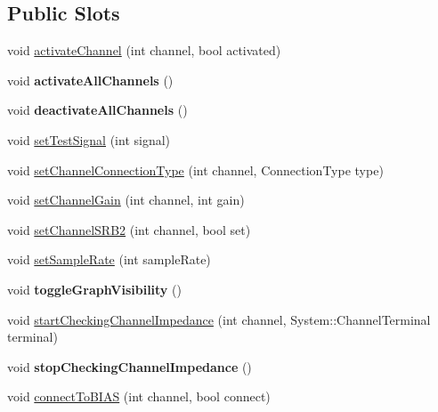 \subsection*{Public Slots}
\begin{DoxyCompactItemize}
\item 
void \hyperlink{classSystem_a2b4ee1465036831f1025add301e6809d}{activate\+Channel} (int channel, bool activated)
\item 
\hypertarget{classSystem_a1fed588e1273e8ea44394c91732a895b}{void {\bfseries activate\+All\+Channels} ()}\label{classSystem_a1fed588e1273e8ea44394c91732a895b}

\item 
\hypertarget{classSystem_ad2364ef8bc782840a0962ad00bcc1e0f}{void {\bfseries deactivate\+All\+Channels} ()}\label{classSystem_ad2364ef8bc782840a0962ad00bcc1e0f}

\item 
void \hyperlink{classSystem_ad6c8a797a836088d9d1706ece4b5480e}{set\+Test\+Signal} (int signal)
\item 
void \hyperlink{classSystem_ab3600fd2a9b8263f832cbe150a65be44}{set\+Channel\+Connection\+Type} (int channel, Connection\+Type type)
\item 
void \hyperlink{classSystem_a843b4c13738156abc2e7ccac51ad46e6}{set\+Channel\+Gain} (int channel, int gain)
\item 
void \hyperlink{classSystem_a40fd7729f43e5ac269a07723ed583ad1}{set\+Channel\+S\+R\+B2} (int channel, bool set)
\item 
void \hyperlink{classSystem_a49b471ea98c2431ad472d3701fca6db6}{set\+Sample\+Rate} (int sample\+Rate)
\item 
\hypertarget{classSystem_a147f252c0eacc362e062b9413441abf8}{void {\bfseries toggle\+Graph\+Visibility} ()}\label{classSystem_a147f252c0eacc362e062b9413441abf8}

\item 
void \hyperlink{classSystem_adbecfc00974b9aeb256abd8c00a1607a}{start\+Checking\+Channel\+Impedance} (int channel, System\+::\+Channel\+Terminal terminal)
\item 
\hypertarget{classSystem_aac1d5642fa6941c6a42a84d2014caaad}{void {\bfseries stop\+Checking\+Channel\+Impedance} ()}\label{classSystem_aac1d5642fa6941c6a42a84d2014caaad}

\item 
void \hyperlink{classSystem_a984ebba834ed5f9a1b24eb761f2f846b}{connect\+To\+B\+I\+A\+S} (int channel, bool connect)
\end{DoxyCompactItemize}
